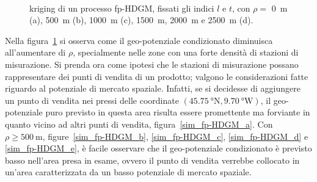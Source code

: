\begin{figure}[htbp]
	\
	\caption[Kriging di un processo fp-HDGM al variare di $\rho$]{kriging di un processo fp-HDGM, fissati gli indici $l$ e $t$, con $\rho=$ \SI{0}{\meter} (a), \SI{500}{\meter} (b), \SI{1000}{\meter} (c), \SI{1500}{\meter}, \SI{2000}{\meter} e \SI{2500}{\meter} (d).}
	\label{sim_fp-HDGM}
\end{figure}
Nella figura~\ref{sim_fp-HDGM} si osserva come il geo-potenziale condizionato diminuisca all'aumentare di $\rho$, specialmente nelle zone con una forte densità di stazioni di misurazione. Si prenda ora come ipotesi che le stazioni di misurazione possano rappresentare dei punti di vendita di un prodotto; valgono le considerazioni fatte riguardo al potenziale di mercato spaziale. Infatti, se si decidesse di aggiungere un punto di vendita nei pressi delle coordinate $(\SI{45.75}{\degree} \text{N}, \SI{9.70}{\degree} \text{W})$, il geo-potenziale puro previsto in questa area risulta essere promettente ma forviante in quanto vicino ad altri punti di vendita, figura~\ref{sim_fp-HDGM_a}. Con $\rho \geq \SI{500}{\meter}$, figure~\ref{sim_fp-HDGM_b}, \ref{sim_fp-HDGM_c},  \ref{sim_fp-HDGM_d} e \ref{sim_fp-HDGM_e}, è facile osservare che il geo-potenziale condizionato è previsto basso nell'area presa in esame, ovvero il punto di vendita verrebbe collocato in un'area caratterizzata da un basso potenziale di mercato spaziale.